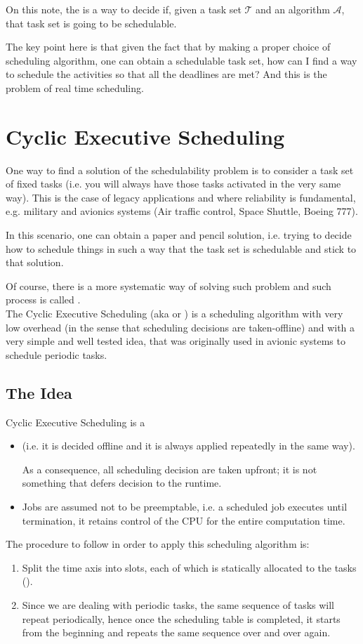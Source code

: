 On this note, the  is a way to decide if, given a task set $\mathcal{T}$ and an algorithm $\mathcal{A}$, that task set is going to be schedulable.

The key point here is that given the fact that by making a proper choice of scheduling algorithm, one can obtain a schedulable task set, how can I find a way to schedule the activities so that all the deadlines are met? And this is the problem of real time scheduling.

\section{Cyclic Executive Scheduling}
One way to find a solution of the schedulability problem is to consider a task set of fixed tasks (i.e. you will always have those tasks activated in the very same way).
This is the case of legacy applications and where reliability is fundamental, e.g. military and avionics systems (Air traffic control, Space Shuttle, Boeing 777).

In this scenario, one can obtain a paper and pencil solution, i.e. trying to decide how to schedule things in such a way that the task set is schedulable and stick to that solution.

Of course, there is a more systematic way of solving such problem and such process is called .\\
The Cyclic Executive Scheduling (aka  or ) is a scheduling algorithm with very low overhead (in the sense that scheduling decisions are taken-offline) and with a very simple and well tested idea, that was originally used in avionic systems to schedule periodic tasks.

\subsection{The Idea}
Cyclic Executive Scheduling is a
\begin{itemize} 
\item {} (i.e. it is decided offline and it is always applied repeatedly in the same way). 

As a consequence, all scheduling decision are taken upfront; it is not something that defers decision to the runtime. 
\item Jobs are assumed not to be preemptable, i.e. a scheduled job executes until termination, it retains control of the CPU for the entire computation time.
\end{itemize}
The procedure to follow in order to apply this scheduling algorithm is:
\begin{enumerate}
\item Split the time axis into slots, each of which is statically allocated to the tasks ().
\item Since we are dealing with periodic tasks, the same sequence of tasks will repeat periodically, hence once the scheduling table is completed, it starts from the beginning and repeats the same sequence over and over again.
\end{enumerate}

